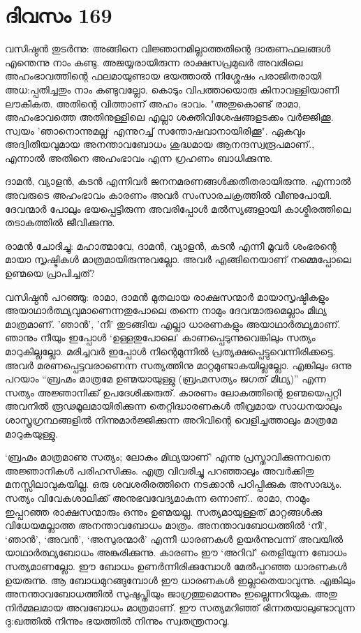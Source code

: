 \section{ദിവസം 169}


വസിഷ്ഠൻ തുടർന്നു: അങ്ങിനെ വിജ്ഞാനമില്ലാത്തതിന്റെ ദാരുണഫലങ്ങൾ എന്തെന്നു നാം കണ്ടു. അജയ്യരായിരുന്ന രാക്ഷസപ്രമുഖർ അവരിലെ അഹംഭാവത്തിന്റെ ഫലമായുണ്ടായ ഭയത്താൽ നിശ്ശേഷം പരാജിതരായി അധ:പ്പതിച്ചതും നാം കണ്ടുവല്ലോ. കൊടും വിപത്തായൊരു കിനാവള്ളിയാണീ ലൗകീകത. അതിന്റെ വിത്താണ്‌ അഹം ഭാവം. "അതുകൊണ്ട് രാമാ, അഹംഭാവത്തെ അതിനുള്ളിലെ എല്ലാ ശക്തിവിശേഷങ്ങളടക്കം വർജ്ജിക്കൂ. സ്വയം ’ഞാനൊന്നുമല്ല‘ എന്നുറച്ച് സന്തോഷവാനായിരിക്കൂ". ഏകവും അദ്വിതീയവുമായ അനന്താവബോധം ശുദ്ധമായ ആനന്ദസ്വരൂപമാണ്‌., എന്നാൽ അതിനെ അഹംഭാവം എന്ന ഗ്രഹണം ബാധിക്കുന്നു.

ദാമൻ, വ്യാളൻ, കടൻ എന്നിവർ ജനനമരണങ്ങൾക്കതീതരായിരുന്നു. എന്നാൽ അവരുടെ അഹംഭാവം കാരണം അവർ സംസാരചക്രത്തിൽ വീണുപോയി. ദേവന്മാർ പോലും ഭയപ്പെട്ടിരുന്ന അവരിപ്പോൾ മൽസ്യങ്ങളായി കാശ്മീരത്തിലെ തടാകത്തിൽ ജീവിക്കുന്നു.

രാമൻ ചോദിച്ചു: മഹാത്മാവേ, ദാമൻ, വ്യാളൻ, കടൻ എന്നീ മൂവർ ശംഭരന്റെ മായാ സൃഷ്ടികൾ മാത്രമായിരുന്നുവല്ലോ. അവർ എങ്ങിനെയാണ്‌ നമ്മെപ്പോലെ ഉണ്മയെ പ്രാപിച്ചത്?

വസിഷ്ഠൻ പറഞ്ഞു: രാമാ, ദാമൻ മുതലായ രാക്ഷസന്മാർ മായാസൃഷ്ടികളും അയാഥാർത്ഥ്യവുമാണെന്നതുപോലെ തന്നെ നാമും ദേവന്മാരുമെല്ലാം മിഥ്യ മാത്രമാണ്‌. 'ഞാൻ', 'നീ' തുടങ്ങിയ എല്ലാ ധാരണകളും അയാഥാർത്ഥ്യമാണ്‌. ഞാനും നീയും ഇപ്പോൾ ‘ഉള്ളതുപോലെ’ കാണപ്പെടുന്നുവെങ്കിലും സത്യം മാറുകില്ലല്ലോ. മരിച്ചവർ ഇപ്പോൾ നിന്റെമുന്നിൽ പ്രത്യക്ഷപ്പെട്ടുവെന്നിരിക്കട്ടെ. അവർ മരണപ്പെട്ടവരാണെന്ന സത്യത്തിനു മാറ്റമുണ്ടാകയില്ലല്ലോ. എങ്കിലും ഒന്നു പറയാം “ബ്രഹ്മം മാത്രമേ ഉണ്മയായുള്ളു (ബ്രഹ്മസത്യം ജഗത് മിഥ്യ)” എന്ന സത്യം അജ്ഞാനിക്ക് ഉപദേശിക്കരുത്. കാരണം ലോകത്തിന്റെ ഉണ്മയെപ്പറ്റി അവനിൽ രൂഢമൂലമായിരിക്കുന്ന തെറ്റിദ്ധാരണകൾ തീവ്രമായ സാധനയാലും ശാസ്ത്രഗ്രന്ഥങ്ങളിൽ നിന്നുമാർജ്ജിക്കുന്ന അറിവിന്റെ വെളിച്ചത്താലും മാത്രമേ മാറുകയുള്ളു.

‘ബ്രഹ്മം മാത്രമാണു സത്യം; ലോകം മിഥ്യയാണ്‌’ എന്നു പ്രസ്താവിക്കുന്നവനെ അജ്ഞാനികൾ പരിഹസിക്കും. എത്ര വിവരിച്ചു പറഞ്ഞാലും അവർക്കിതു മനസ്സിലാവുകയില്ല. ഒരു ശവശരീരത്തിനെ നടക്കാൻ പഠിപ്പിക്കുക അസാദ്ധ്യം. സത്യം വിവേകശാലിക്ക് അനുഭവവേദ്യമാകുന്ന ഒന്നാണ്‌.. രാമാ, നാമും ഇപ്പറഞ്ഞ രാക്ഷസന്മാരും ഒന്നും ഉണ്മയല്ല. സത്യമായുള്ളത് മാറ്റങ്ങൾക്കു വിധേയമല്ലാത്ത അനന്താവബോധം മാത്രം. അനന്താവബോധത്തിൽ ‘നീ’, ‘ഞാൻ’, ‘അവൻ’, ‘അസുരന്മാർ’ എന്നീ ധാരണകൾ ഉയർന്നുവന്ന് അവയിൽ യാഥാർത്ഥ്യബോധം അങ്കുരിക്കുന്നു. കാരണം ഈ ‘അറിവ്’ തെളിയുന്ന ബോധം സത്യമാണല്ലോ. ഈ ബോധം ഉണർന്നിരിക്കുമ്പോൾ മേൽപ്പറഞ്ഞ ധാരണകൾ ഉയരുന്നു. ആ ബോധമുറങ്ങുമ്പോൾ ഈ ധാരണകൾ ഇല്ലാതെയാവുന്നു. എങ്കിലും അനന്താവബോധത്തിൽ സുഷുപ്തിയും ജാഗ്രത്തുമൊന്നും ഇല്ലെന്നറിയുക. അതു നിർമ്മലമായ അവബോധം മാത്രമാണ്‌. ഈ സത്യമറിഞ്ഞ് ഭിന്നതയാലുണ്ടാവുന്ന ദു:ഖത്തിൽ നിന്നും ഭയത്തിൽ നിന്നും സ്വതന്ത്രനാവൂ. 
